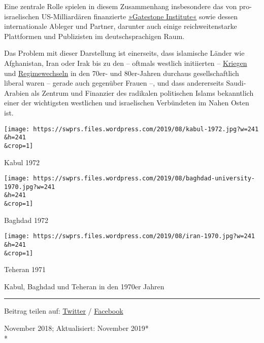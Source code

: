 Eine zentrale Rolle spielen in diesem Zusammenhang insbesondere das von
pro-israelischen US-Mil­liar­­dä­ren finan­zierte
\href{https://www.alternet.org/2015/11/one-americas-most-dangerous-think-tanks-spreading-islamophobic-hate-across-atlantic/}{»Gatestone
Institute«} sowie dessen internationale Ableger und Partner, da­run­ter
auch einige reichweitenstarke Plattformen und Publizisten im
deutschsprachigen Raum.

Das Problem mit dieser Darstellung ist einerseits, dass islamische
Länder wie Afghanistan, Iran oder Irak bis zu den -- oftmals westlich
initiierten --
\href{https://www.voltairenet.org/article165889.html}{Kriegen} und
\href{https://www.theguardian.com/world/2016/jun/10/ayatollah-khomeini-jimmy-carter-administration-iran-revolution}{Regime­wechseln}
in den 70er- und 80er-Jahren durchaus gesellschaftlich liberal waren --
gerade auch gegenüber Frauen --, und dass anderer­seits Saudi-Arabien
als Zentrum und Finanzier des radikalen politischen Islams bekanntlich
einer der wich­­tig­s­­ten westlichen und israelischen Verbündeten im
Nahen Osten ist.

\href{https://swprs.org/migration-und-medien/kabul-1972/}{}

\texttt{[image: https://swprs.files.wordpress.com/2019/08/kabul-1972.jpg?w=241\\\&h=241\\\&crop=1]}

Kabul 1972

\href{https://swprs.org/migration-und-medien/baghdad-university-1970/}{}

\texttt{[image: https://swprs.files.wordpress.com/2019/08/baghdad-university-1970.jpg?w=241\\\&h=241\\\&crop=1]}

Baghdad 1972

\href{https://swprs.org/migration-und-medien/iran-1970/}{}

\texttt{[image: https://swprs.files.wordpress.com/2019/08/iran-1970.jpg?w=241\\\&h=241\\\&crop=1]}

Teheran 1971

Kabul, Baghdad und Teheran in den 1970er Jahren

\begin{center}\rule{0.5\linewidth}{\linethickness}\end{center}

Beitrag teilen auf:
\href{https://twitter.com/intent/tweet?url=https://swprs.org/migration-und-medien/}{Twitter}
/
\href{https://www.facebook.com/share.php?u=https://swprs.org/migration-und-medien/}{Facebook}

November 2018; Aktualisiert: November 2019*\\
*

